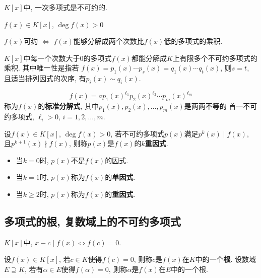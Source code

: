 \begin{Corollary}[!]
$K[x]$中, 一次多项式是不可约的.
\end{Corollary}

\begin{Corollary}
$f(x) \in K[x]$, $\deg f(x) > 0$
\begin{center}
$f(x)$可约 $\iff$ $f(x)$能够分解成两个次数比$f(x)$低的多项式的乘积.
\end{center}
\end{Corollary}

\begin{Theorem}[唯一因式分解定理]
$K[x]$中每一个次数大于$0$的多项式$f(x)$都能\;\;分解成$K$上有限多个不可约多项式的乘积. 其中唯一性是指若
$f(x) = p_1(x)\cdots p_s(x) = q_1(x) \cdots q_t(x)$, 则$s=t$, 且适当排列因式的次序, 有$p_i(x) \sim q_i(x)$.
\end{Theorem}

\begin{Note}[标准分解式]
\[
f(x) = a p_1(x) ^{\ell_1} p_2(x)^{\ell_2} \cdots p_m(x)^{\ell_m}
\]
称为$f(x)$的\textbf{标准分解式}, 其中$p_1(x), p_2(x), \dots, p_m(x)$是两两不等的
首一不可约多项式, $\ell_i > 0$, $i = 1, 2, \dots, m$.
\end{Note}

\begin{Definition}
设$f(x) \in K[x]$, $\deg f(x) > 0$, 若不可约多项式$p(x)$满足$p^k(x) \mid f(x)$, 且$p^{k+1}(x) \nmid f(x)$,
则称$p(x)$是$f(x)$的\textbf{$k$重因式}. 
\begin{itemize}
\item 当$k = 0$时, $p(x)$不是$f(x)$的因式. 
\item 当$k = 1$时, $p(x)$称为$f(x)$的\textbf{单因式}.
\item 当$k \ge 2$时, $p(x)$称为$f(x)$的\textbf{重因式}.
\end{itemize}
\end{Definition}

\subsection{多项式的根, 复数域上的不可约多项式}

\begin{Theorem}
$K[x]$中, $x - c \mid f(x) \iff f(c) = 0$.
\end{Theorem}

\begin{Definition}[根]
设$f(x) \in K[x]$, 若$c \in K$使得$f(c) = 0$, 则称$c$是$f(x)$在$K$中的一个\textbf{根}. 设数域$E \supseteq K$, 若有$\alpha \in E$使得$f(\alpha) = 0$, 则称$\alpha$是$f(x)$在$E$中的一个根.
\end{Definition}

